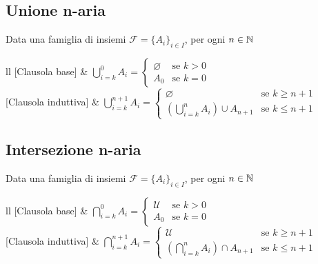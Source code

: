 \documentclass{article}
\begin{document}
\subsection*{Unione n-aria}
Data una famiglia di insiemi \(\mathcal{F} = \{A_i\}_{i \in I}\), per ogni \(n \in \mathbb{N}\)
\begin{center}
    \begin{tabular}{ll}
        {[Clausola base]}      & \(\displaystyle \bigcup_{i = k}^0 A_i =
        \begin{cases}
            \varnothing & \text{se } k > 0 \\
            A_0         & \text{se } k = 0
        \end{cases}
        \)                                                                     \\
        {[Clausola induttiva]} & \(\displaystyle \bigcup_{i = k}^{n + 1} A_i =
        \begin{cases}
            \varnothing                            & \text{se } k \geq n + 1 \\
            (\bigcup_{i = k}^n A_i) \cup A_{n + 1} & \text{se } k \leq n + 1
        \end{cases}
        \)
    \end{tabular}
\end{center}
\subsection*{Intersezione n-aria}
Data una famiglia di insiemi \(\mathcal{F} = \{A_i\}_{i \in I}\), per ogni \(n \in \mathbb{N}\)
\begin{center}
    \begin{tabular}{ll}
        {[Clausola base]}      & \(\displaystyle \bigcap_{i = k}^0 A_i =
        \begin{cases}
            \mathcal{U} & \text{se } k > 0 \\
            A_0         & \text{se } k = 0
        \end{cases}
        \)                                                                     \\
        {[Clausola induttiva]} & \(\displaystyle \bigcap_{i = k}^{n + 1} A_i =
        \begin{cases}
            \mathcal{U}                            & \text{se } k \geq n + 1 \\
            (\bigcap_{i = k}^n A_i) \cap A_{n + 1} & \text{se } k \leq n + 1
        \end{cases}
        \)
    \end{tabular}
\end{center}
\end{document}
